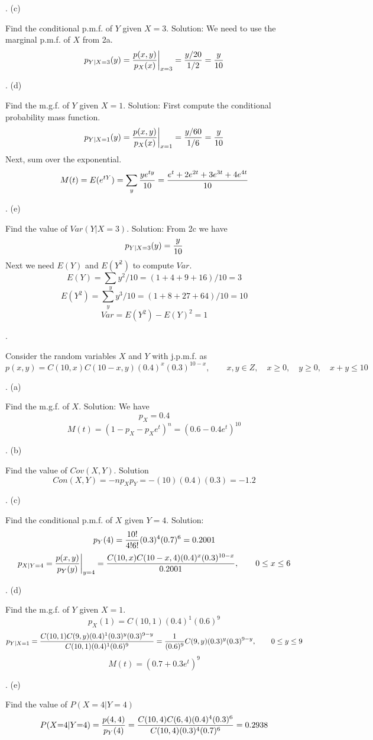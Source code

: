 . (c)

Find the conditional p.m.f. of $Y$ given $X=3$.
\medskip\noindent
Solution: We need to use the marginal p.m.f. of $X$ from 2a.
$$p_{Y|X{=}3}(y)={p(x,y)\over p_X(x)}\bigg|_{x=3}={y/20\over1/2}={y\over10}$$

. (d)

Find the m.g.f. of $Y$ given $X=1$.
\medskip\noindent
Solution: First compute the conditional probability mass function.
$$p_{Y|X{=}1}(y)={p(x,y)\over p_X(x)}\bigg|_{x=1}={y/60\over1/6}={y\over10}$$
Next, sum over the exponential.
$$M(t)=E(e^{tY})=\sum_y{ye^{ty}\over10}={e^t+2e^{2t}+3e^{3t}+4e^{4t}\over10}$$

. (e)

Find the value of $Var(Y|X{=}3)$.
\medskip\noindent
Solution: From 2c we have
$$p_{Y|X{=}3}(y)={y\over10}$$
Next we need $E(Y)$ and $E(Y^2)$ to compute $Var$.
$$E(Y)=\sum_yy^2/10=(1+4+9+16)/10=3$$
$$E(Y^2)=\sum_yy^3/10=(1+8+27+64)/10=10$$
$$Var=E(Y^2)-E(Y)^2=1$$

\vfill\eject

.

Consider the random variables $X$ and $Y$ with j.p.m.f. as
$$p(x,y)=C(10,x)C(10-x,y)(0.4)^x(0.3)^{10-x},\qquad
x,y\in Z,\quad x\ge0,\quad y\ge0,\quad x+y\le10$$

. (a)

Find the m.g.f. of $X$.
\medskip\noindent
Solution: We have
$$p_X=0.4$$
$$M(t)=(1-p_X-p_Xe^t)^n=(0.6-0.4e^t)^{10}$$

. (b)

Find the value of $Cov(X,Y)$.
\medskip\noindent
Solution
$$Con(X,Y)=-np_Xp_Y=-(10)(0.4)(0.3)=-1.2$$

. (c)

Find the conditional p.m.f. of $X$ given $Y=4$.
\medskip\noindent
Solution:
$$p_Y(4)={10!\over4!6!}(0.3)^4(0.7)^6=0.2001$$
$$p_{X|Y{=}4}={p(x,y)\over p_Y(y)}\bigg|_{y=4}={
C(10,x)C(10-x,4)(0.4)^x(0.3)^{10-x}
\over
0.2001
},\qquad0\le x\le 6$$

. (d)

Find the m.g.f. of $Y$ given $X=1$.
\medskip\noindent
$$p_X(1)=C(10,1)(0.4)^1(0.6)^9$$
$$p_{Y|X{=}1}={C(10,1)C(9,y)(0.4)^1(0.3)^y(0.3)^{9-y}\over C(10,1)(0.4)^1(0.6)^9}
={1\over(0.6)^9}C(9,y)(0.3)^y(0.3)^{9-y},
\qquad0\le y\le9$$
$$M(t)=(0.7+0.3e^t)^9$$

. (e)

Find the value of $P(X{=}4|Y{=}4)$
\medskip\noindent
$$P(X{=}4|Y{=}4)={p(4,4)\over p_Y(4)}
={C(10,4)C(6,4)(0.4)^4(0.3)^6\over C(10,4)(0.3)^4(0.7)^6}=0.2938$$

